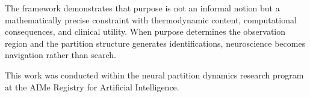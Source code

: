 \documentclass[aps,prd,twocolumn,superscriptaddress,floatfix,nofootinbib]{revtex4-2}
\theoremstyle{remark}
\begin{document}
The framework demonstrates that purpose is not an informal notion but a mathematically precise constraint with thermodynamic content, computational consequences, and clinical utility.
When purpose determines the observation region and the partition structure generates identifications, neuroscience becomes navigation rather than search.

\begin{acknowledgments}
This work was conducted within the neural partition dynamics research program at the AIMe Registry for Artificial Intelligence.
\end{acknowledgments}



\end{document}
